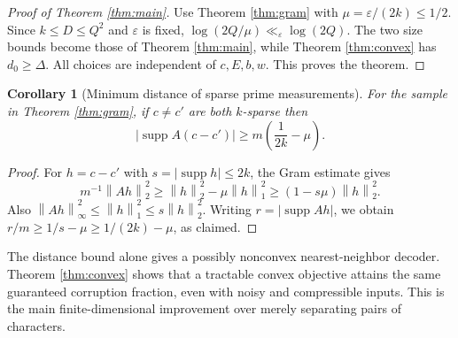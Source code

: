 \documentclass[11pt]{article}
\newtheorem{corollary}[theorem]{Corollary}
\theoremstyle{remark}\newtheorem{remark}[theorem]{Remark}
\newcommand{\supp}{\operatorname{supp}}
\newcommand{\norm}[1]{\left\lVert#1\right\rVert}
\newcommand{\abs}[1]{\left|#1\right|}
\newcommand{\eps}{\varepsilon}
\begin{document}
\begin{proof}[Proof of Theorem \ref{thm:main}]
Use Theorem \ref{thm:gram} with $\mu=\eps/(2k)\le1/2$. Since $k\le D\le Q^2$ and $\eps$ is fixed, $\log(2Q/\mu)\ll_\eps\log(2Q)$. The two size bounds become those of Theorem \ref{thm:main}, while Theorem \ref{thm:convex} has $d_0\ge\Delta$. All choices are independent of $c,E,b,w$. This proves the theorem.
\end{proof}

\begin{corollary}[Minimum distance of sparse prime measurements]\label{cor:dist}
For the sample in Theorem \ref{thm:gram}, if $c\ne c'$ are both $k$-sparse then
\[
 \abs{\supp A(c-c')}\ge m\left(\frac1{2k}-\mu\right).
\]
\end{corollary}
\begin{proof}
For $h=c-c'$ with $s=\abs{\supp h}\le2k$, the Gram estimate gives
\[
 m^{-1}\norm{Ah}_2^2\ge\norm h_2^2-\mu\norm h_1^2\ge(1-s\mu)\norm h_2^2.
\]
Also $\norm{Ah}_\infty^2\le\norm h_1^2\le s\norm h_2^2$. Writing $r=\abs{\supp Ah}$, we obtain $r/m\ge 1/s-\mu\ge1/(2k)-\mu$, as claimed.
\end{proof}
The distance bound alone gives a possibly nonconvex nearest-neighbor decoder. Theorem \ref{thm:convex} shows that a tractable convex objective attains the same guaranteed corruption fraction, even with noisy and compressible inputs. This is the main finite-dimensional improvement over merely separating pairs of characters.
\end{document}
